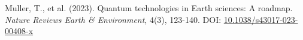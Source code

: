 \documentclass{article}
\begin{document}
\begin{thebibliography}{9}
Muller, T., et al. (2023). Quantum technologies in Earth sciences: A roadmap. \textit{Nature Reviews Earth \& Environment}, 4(3), 123-140.  
DOI: \href{https://doi.org/10.1038/s43017-023-00408-x}{10.1038/s43017-023-00408-x}
\end{thebibliography}
\end{document}

